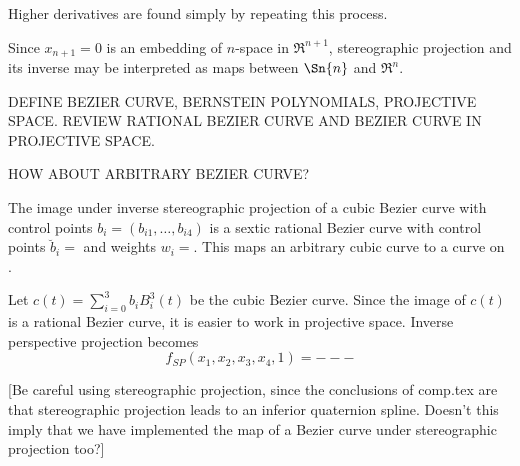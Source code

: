 \documentclass[12pt]{article}
\begin{document}
Higher derivatives are found simply by repeating this process.

Since $x_{n+1}=0$ is an embedding of $n$-space in $\Re^{n+1}$,
stereographic projection and its inverse may be interpreted as maps between 
$\Sn{n}$ and $\Re^n$.

DEFINE BEZIER CURVE, BERNSTEIN POLYNOMIALS, PROJECTIVE SPACE.
REVIEW RATIONAL BEZIER CURVE AND BEZIER CURVE IN PROJECTIVE SPACE.

HOW ABOUT ARBITRARY BEZIER CURVE?

\begin{theorem}
\label{thm:imagecurve}
The image under inverse stereographic projection 
of a cubic Bezier curve with control points $b_i = (b_{i1},\ldots,b_{i4})$
is a sextic rational Bezier curve 
with control points $\breve{b}_i = $ 
and weights $w_i = $.
This maps an arbitrary cubic curve to a curve on .
\end{theorem}
\prf
Let $c(t) = \sum_{i=0}^3 b_i B_i^3(t)$ be the cubic Bezier curve.
Since the image of $c(t)$ is a rational Bezier curve,
it is easier to work in projective space.
Inverse perspective projection becomes
\[
f_{SP}(x_1,x_2,x_3,x_4,1) = ---
\]
\QED


[Be careful using stereographic projection, since the conclusions of comp.tex are that
stereographic projection leads to an inferior quaternion spline.
Doesn't this imply that we have implemented the map of a Bezier curve under
stereographic projection too?]
\end{document}
